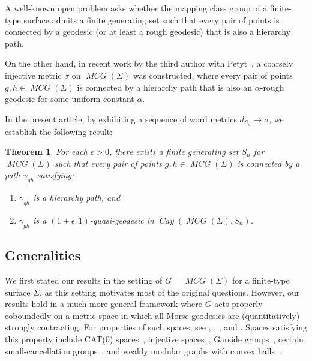 \documentclass{amsart}
\newtheorem{mainthm}{Theorem}
\numberwithin{thm}{section}
\numberwithin{figure}{section}
\theoremstyle{definition}
\theoremstyle{definition}
\theoremstyle{remark}
\numberwithin{equation}{section}
\DeclareMathOperator{\Cay}{\mathit{Cay}}
\DeclareMathOperator{\MCG}{\mathit{MCG}}
\theoremstyle{plain}
\begin{document}
A well-known open problem asks whether the mapping class group of a finite-type surface admits a finite generating set such that every pair of points is connected by a geodesic (or at least a rough geodesic) that is also a hierarchy path. 

On the other hand, in recent work by the third author with Petyt~\cite{PetytZalloum24}, a coarsely injective metric $\sigma$ on $\MCG(\Sigma)$ was constructed, where every pair of points $g, h \in \MCG(\Sigma)$ is connected by a hierarchy path that is also an $\alpha$-rough geodesic for some uniform constant $\alpha$. 

In the present article, by exhibiting a sequence of word metrics $d_{S_n} \to \sigma$, we establish the following result:

\begin{mainthm}\label{thm:good_hierarchies} 
For each $\epsilon > 0$, there exists a finite generating set $S_n$ for $\MCG(\Sigma)$ such that every pair of points $g,h \in \MCG(\Sigma)$ is connected by a path $\gamma_{gh}$ satisfying:

\begin{enumerate}
    \item $\gamma_{gh}$ is a hierarchy path, and
    
    \item $\gamma_{gh}$ is a $(1+\epsilon, 1)$-quasi-geodesic in $\Cay(\MCG(\Sigma), S_n)$.
\end{enumerate}

\end{mainthm}












\subsection{Generalities}
\label{subsec:generalities}
We first stated our results in the setting of $G = \MCG(\Sigma)$ for a finite-type surface $\Sigma$, as this setting motivates most of the original questions. However, our results hold in a much more general framework where $G$ acts properly coboundedly on a metric space in which all Morse geodesics are (quantitatively) strongly contracting. For properties of such spaces, see \cite{Yang2018}, \cite{Yang17:ConvexCocompact}, \cite{COULON2024}, and \cite{CGZ24:Confined}. Spaces satisfying this property include CAT(0) spaces~\cite{charneysultan:contracting}, injective spaces~\cite{SistoZalloum2024}, Garside groups~\cite{calvezwiest:morse}, certain small-cancellation groups~\cite{zbinden:small}, and weakly modular graphs with convex balls~\cite{soergelzalloum:morse}.
\end{document}
